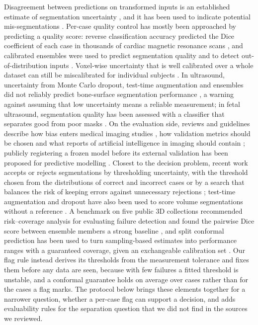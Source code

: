 \documentclass[journal,twoside]{IEEEtran}
\begin{document}
Disagreement between predictions on transformed inputs is an established estimate of segmentation uncertainty
\cite{wang2019a}, and it has been used to indicate potential mis-segmentations \cite{wang2019b}. Per-case quality
control has mostly been approached by predicting a quality score: reverse classification accuracy predicted the Dice
coefficient of each case in thousands of cardiac magnetic resonance scans \cite{robinson2019}, and calibrated
ensembles were used to predict segmentation quality and to detect out-of-distribution inputs \cite{mehrtash2020}.
Voxel-wise uncertainty that is well calibrated over a whole dataset can still be miscalibrated for individual
subjects \cite{jungo2019}. In ultrasound, uncertainty from Monte Carlo dropout, test-time augmentation and ensembles
did not reliably predict bone-surface segmentation performance \cite{pandey2022}, a warning against assuming that low
uncertainty means a reliable measurement; in fetal ultrasound, segmentation quality has been assessed with a
classifier that separates good from poor masks \cite{cengiz2023}. On the evaluation side, reviews and guidelines describe how bias enters medical imaging studies
\cite{varoquaux2022}, how validation metrics should be chosen \cite{maierhein2024} and what reports of artificial
intelligence in imaging should contain \cite{tejani2024}; publicly registering a frozen model before its external
validation has been proposed for predictive modelling \cite{gallitto2025}. Closest to the decision problem, recent
work accepts or rejects segmentations by thresholding uncertainty, with the threshold chosen from the distributions of
correct and incorrect cases \cite{vanlente2025} or by a search that balances the risk of keeping errors against
unnecessary rejections \cite{norajitra2026}; test-time augmentation and dropout have also been used to score volume
segmentations without a reference \cite{li2024}. A benchmark on five public 3D collections recommended risk--coverage
analysis for evaluating failure detection and found the pairwise Dice score between ensemble members a strong
baseline \cite{zenk2025}, and split conformal prediction has been used to turn sampling-based estimates into
performance ranges with a guaranteed coverage, given an exchangeable calibration set \cite{wundram2024}. Our flag
rule instead derives its thresholds from the measurement tolerance and fixes them before any data are seen, because
with few failures a fitted threshold is unstable, and a conformal guarantee holds on average over cases rather than
for the cases a flag marks. The
protocol below brings these elements
together for a narrower question, whether a per-case flag can support a decision, and adds evaluability rules for the
separation question that we did not find in the sources we reviewed.
\end{document}
